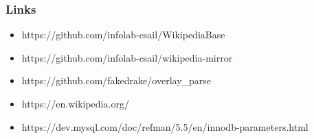 \documentclass[bigger]{beamer}
\begin{document}
\begin{frame}
  \frametitle{Links}
  \begin{itemize}
  \item https://github.com/infolab-csail/WikipediaBase
  \item https://github.com/infolab-csail/wikipedia-mirror
  \item https://github.com/fakedrake/overlay_parse
  \item https://en.wikipedia.org/
  \item https://dev.mysql.com/doc/refman/5.5/en/innodb-parameters.html
  \end{itemize}
\end{frame}
\end{document}
